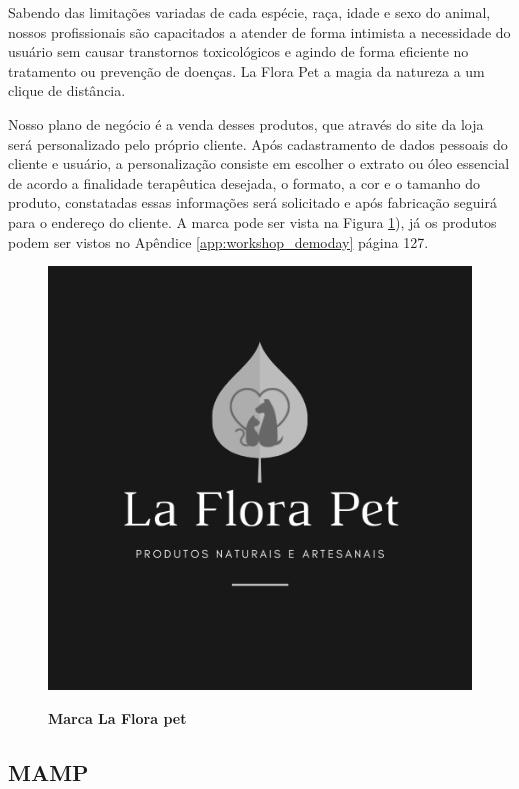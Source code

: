 Sabendo das limitações variadas de cada espécie, raça, idade e sexo do animal, nossos profissionais são capacitados a atender de forma intimista a necessidade do usuário sem causar transtornos toxicológicos e agindo de forma eficiente no tratamento ou prevenção de doenças. La Flora Pet a magia da natureza a um clique de distância.

Nosso plano de negócio é a venda desses produtos, que através do site da loja será personalizado pelo próprio cliente. Após cadastramento de dados pessoais do cliente e usuário, a personalização consiste em escolher o extrato ou óleo essencial de acordo a finalidade terapêutica desejada, o formato, a cor e o tamanho do produto, constatadas essas informações será solicitado e após fabricação seguirá para o endereço do cliente. A marca pode ser vista na Figura \ref{figura_24}), já os produtos podem ser vistos no Apêndice \ref{app:workshop_demoday} página 127.


\begin{figure}[H]
\centering
\caption{\textbf{Marca La Flora pet}}
\includegraphics[scale=5]{Imagens/laflorapet.png}
\label{figura_24}
\end{figure}



\subsection{MAMP}


